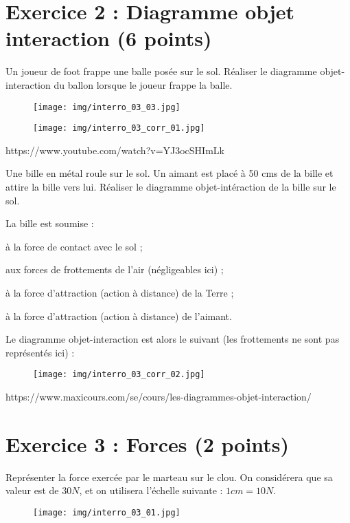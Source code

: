 \documentclass{exam}
\begin{document}
\section*{Exercice 2 : Diagramme objet interaction (6 points)}
\begin{questions}
  \question[3] Un joueur de foot frappe une balle posée sur le sol. Réaliser le diagramme objet-interaction du ballon lorsque le joueur frappe la balle. 
  \begin{figure}[H]
    \centering
    \texttt{[image: img/interro\_03\_03.jpg]}
  \end{figure}
  \begin{solution}
    \begin{figure}[H]
      \centering
      \texttt{[image: img/interro\_03\_corr\_01.jpg]}
    \end{figure}
    https://www.youtube.com/watch?v=YJ3ocSHImLk
  \end{solution}

  \question[3] Une bille en métal roule sur le sol. Un aimant est placé à 50 cms de la bille et attire la bille vers lui. Réaliser le diagramme objet-intéraction de la bille sur le sol.
  \begin{solution}

    La bille est soumise :
\begin{compactitem}
    \item à la force de contact avec le sol ;
    \item aux forces de frottements de l'air (négligeables ici) ;
    \item à la force d'attraction (action à distance) de la Terre ;
    \item à la force d'attraction (action à distance) de l'aimant.
\end{compactitem}

Le diagramme objet-interaction est alors le suivant (les frottements ne sont pas représentés ici) :

    \begin{figure}[H]
      \centering
      \texttt{[image: img/interro\_03\_corr\_02.jpg]}
    \end{figure}
    https://www.maxicours.com/se/cours/les-diagrammes-objet-interaction/
  \end{solution}
\end{questions}

\section*{Exercice 3 : Forces (2 points)}
\begin{questions}
  \question[2] Représenter la force exercée par le marteau sur le clou. On considérera que sa valeur est de $30 N$, et on utilisera l'échelle suivante : $1cm = 10N$.
  \begin{figure}[H]
    \centering
    \texttt{[image: img/interro\_03\_01.jpg]}
  \end{figure}
\end{questions}
\end{document}
